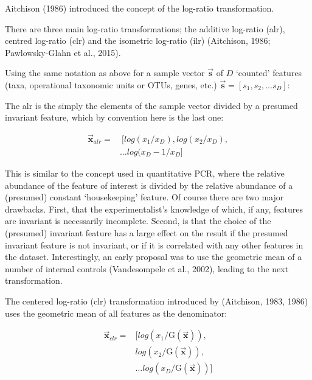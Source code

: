 \documentclass[twocolumn]{article}
\begin{document}
Aitchison (1986) introduced the concept of the log-ratio transformation.

There are three main log-ratio transformations; the additive log-ratio
(alr), centred log-ratio (clr) and the isometric log-ratio (ilr)
(Aitchison, 1986; Pawlowsky-Glahn et al., 2015).

Using the same notation as above for a sample vector
\(\vec{\textbf{s}}\) of \(D\) `counted' features (taxa, operational
taxonomic units or OTUs, genes, etc.)
\(\vec{\textbf{s}}=[s_1, s_2, ... s_D]\):

The alr is the simply the elements of the sample vector divided by a
presumed invariant feature, which by convention here is the last one:

\begin{equation}
\begin{aligned}
 \vec{\textbf{x}}_{alr}= &\ [log(x_1/x_D), log(x_2/x_D), \\
 & \ldots log(x_D-1/x_D]
\end{aligned}
 \label{eq:alr}
\end{equation}

This is similar to the concept used in quantitative PCR, where the
relative abundance of the feature of interest is divided by the relative
abundance of a (presumed) constant `housekeeping' feature. Of course
there are two major drawbacks. First, that the experimentalist's
knowledge of which, if any, features are invariant is necessarily
incomplete. Second, is that the choice of the (presumed) invariant
feature has a large effect on the result if the presumed invariant
feature is not invariant, or if it is correlated with any other features
in the dataset. Interestingly, an early proposal was to use the
geometric mean of a number of internal controls (Vandesompele et al.,
2002), leading to the next transformation.

The centered log-ratio (clr) transformation introduced by (Aitchison,
1983, 1986) uses the geometric mean of all features as the denominator:

\begin{equation}
\begin{aligned}
   \vec{\textbf{x}}_{clr} = & [log(x_1/\mathrm{G}(\vec{\textbf{x}})), \\
   & log(x_2/\mathrm{G}(\vec{\textbf{x}})), \\
   & \ldots log(x_D/\mathrm{G}(\vec{\textbf{x}}))]
\end{aligned}
\label{eq:clr}
\end{equation}
\end{document}
